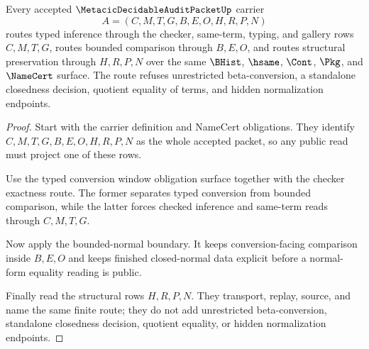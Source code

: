 \begin{theorem}
\label{thm:metacic-decidable-audit-scoped-kernel-route}
Every accepted $\MetacicDecidableAuditPacketUp$ carrier
$$
A=(C,M,T,G,B,E,O,H,R,P,N)
$$
routes typed inference through the checker, same-term, typing, and gallery rows $C,M,T,G$, routes bounded comparison through $B,E,O$, and routes structural preservation through $H,R,P,N$ over the same $\BHist$, $\hsame$, $\Cont$, $\Pkg$, and $\NameCert$ surface. The route refuses unrestricted beta-conversion, a standalone closedness decision, quotient equality of terms, and hidden normalization endpoints.
\end{theorem}
\begin{proof}
Start with the carrier definition and NameCert obligations. They identify $C,M,T,G,B,E,O,H,R,P,N$ as the whole accepted packet, so any public read must project one of these rows.

Use the typed conversion window obligation surface together with the checker exactness route. The former separates typed conversion from bounded comparison, while the latter forces checked inference and same-term reads through $C,M,T,G$.

Now apply the bounded-normal boundary. It keeps conversion-facing comparison inside $B,E,O$ and keeps finished closed-normal data explicit before a normal-form equality reading is public.

Finally read the structural rows $H,R,P,N$. They transport, replay, source, and name the same finite route; they do not add unrestricted beta-conversion, standalone closedness decision, quotient equality, or hidden normalization endpoints.
\end{proof}

